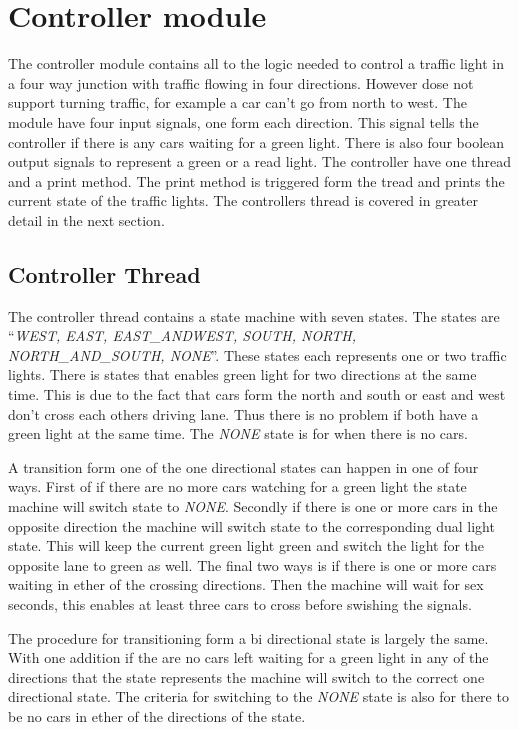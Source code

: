 \section{Controller module}
The controller module contains all to the logic needed to control a traffic light in a four way junction with traffic flowing in four directions. However dose not support turning traffic, for example a car can't go from north to west. The module have four input signals, one form each direction. This signal tells the controller if there is any cars waiting for a green light. There is also four boolean output signals to represent a green or a read light. The controller have one thread and a print method. The print method is triggered form the tread and prints the current state of the traffic lights. The controllers thread is covered in greater detail in the next section. 



\subsection{Controller Thread}
The controller thread contains a state machine with seven states. The states are ``\emph{WEST, EAST, EAST{\_}AND{\N}WEST, SOUTH, NORTH, NORTH{\_}AND{\_}SOUTH, NONE}''. These states each represents one or two traffic lights. There is states that enables green light for two directions at the same time. This is due to the fact that cars form the north and south or east and west don't cross each others driving lane. Thus there is no problem if both have a green light at the same time. The \emph{NONE} state is for when there is no cars.

A transition form one of the one directional states can happen in one of four ways. First of if there are no more cars watching for a green light the state machine will switch state to \emph{NONE}. Secondly if there is one or more cars in the opposite direction the machine will switch state to the corresponding dual light state. This will keep the current green light green and switch the light for the opposite lane to green as well. The final two ways is if there is one or more cars waiting in ether of the crossing directions. Then the machine will wait for sex seconds, this enables at least three cars to cross before swishing the signals.

The procedure for transitioning form a bi directional state is largely the same. With one addition if the are no cars left waiting for a green light in any of the directions that the state represents the machine will switch to the correct one directional state. The criteria for switching to the \emph{NONE} state is also for there to be no cars in ether of the directions of the state.
